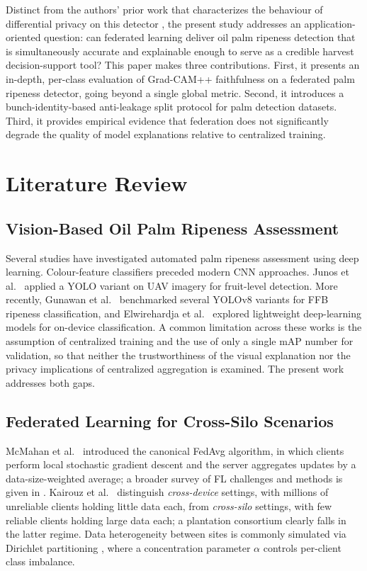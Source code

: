 \documentclass[conference, compsoc, twoside]{IEEEtran}
\begin{document}
Distinct from the authors' prior work that characterizes the behaviour of differential privacy on this detector \cite{paperA}, the present study addresses an application-oriented question: can federated learning deliver oil palm ripeness detection that is simultaneously accurate and explainable enough to serve as a credible harvest decision-support tool? This paper makes three contributions. First, it presents an in-depth, per-class evaluation of Grad-CAM++ faithfulness on a federated palm ripeness detector, going beyond a single global metric. Second, it introduces a bunch-identity-based anti-leakage split protocol for palm detection datasets. Third, it provides empirical evidence that federation does not significantly degrade the quality of model explanations relative to centralized training.

\section{Literature Review}

\subsection{Vision-Based Oil Palm Ripeness Assessment}
Several studies have investigated automated palm ripeness assessment using deep learning. Colour-feature classifiers \cite{sabri2017} preceded modern CNN approaches. Junos et al.\ \cite{junos2022} applied a YOLO variant on UAV imagery for fruit-level detection. More recently, Gunawan et al.\ \cite{gunawan2023} benchmarked several YOLOv8 variants for FFB ripeness classification, and Elwirehardja et al.\ \cite{elwirehardja2021} explored lightweight deep-learning models for on-device classification. A common limitation across these works is the assumption of centralized training and the use of only a single mAP number for validation, so that neither the trustworthiness of the visual explanation nor the privacy implications of centralized aggregation is examined. The present work addresses both gaps.

\subsection{Federated Learning for Cross-Silo Scenarios}
McMahan et al.\ \cite{fedavg} introduced the canonical FedAvg algorithm, in which clients perform local stochastic gradient descent and the server aggregates updates by a data-size-weighted average; a broader survey of FL challenges and methods is given in \cite{li2020federated}. Kairouz et al.\ \cite{kairouz2021} distinguish \textit{cross-device} settings, with millions of unreliable clients holding little data each, from \textit{cross-silo} settings, with few reliable clients holding large data each; a plantation consortium clearly falls in the latter regime. Data heterogeneity between sites is commonly simulated via Dirichlet partitioning \cite{hsu2019}, where a concentration parameter $\alpha$ controls per-client class imbalance.
\end{document}
